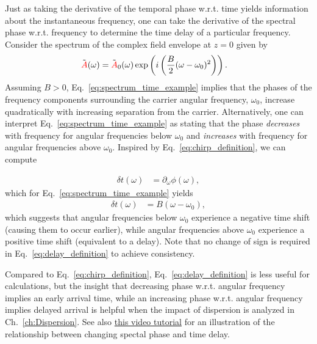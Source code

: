 Just as taking the derivative of the temporal phase w.r.t. time yields information about the instantaneous frequency, one can take the derivative of the spectral phase w.r.t. frequency to determine the time delay of a particular frequency. Consider the spectrum of the complex field envelope at $z=0$ given by
\begin{align}
\label{eq:spectrum_time_example}
    \Tilde{\textcolor{red}{A}}(\omega) &= \Tilde{\textcolor{red}{A}}_0(\omega)\exp\left( i\left(\frac{B}{2}(\omega-\omega_0)^2 \right)   \right).
\end{align}
Assuming $B>0$, Eq.~\ref{eq:spectrum_time_example} implies that the phases of the frequency components surrounding the carrier angular frequency, $\omega_0$, increase quadratically with increasing separation from the carrier. Alternatively, one can interpret Eq.~\ref{eq:spectrum_time_example} as stating that the phase \emph{decreases} with frequency for angular frequencies below $\omega_0$ and \emph{increases} with frequency for angular frequencies above $\omega_0$. Inspired by Eq.~\ref{eq:chirp_definition}, we can compute

\begin{align}
\label{eq:delay_definition}
    \delta t(\omega) &= \partial_\omega\phi(\omega),
\end{align}
which for Eq.~\ref{eq:spectrum_time_example} yields
\begin{align}
    \delta t(\omega) &=  B(\omega-\omega_0),
\end{align}
which suggests that angular frequencies below $\omega_0$ experience a negative time shift (causing them to occur earlier), while angular frequencies above $\omega_0$ experience a positive time shift (equivalent to a delay). Note that no change of sign is required in Eq.~\ref{eq:delay_definition} to achieve consistency. 

Compared to Eq.~\ref{eq:chirp_definition}, Eq.~\ref{eq:delay_definition} is less useful for calculations, but the insight that decreasing phase w.r.t. angular frequency implies an early arrival time, while an increasing phase w.r.t. angular frequency implies delayed arrival is helpful when the impact of dispersion is analyzed in Ch.~\ref{ch:Dispersion}. See also \href{https://youtu.be/E3S0BQiy3p8}{this video tutorial} for an illustration of the relationship between changing spectal phase and time delay.  
 





